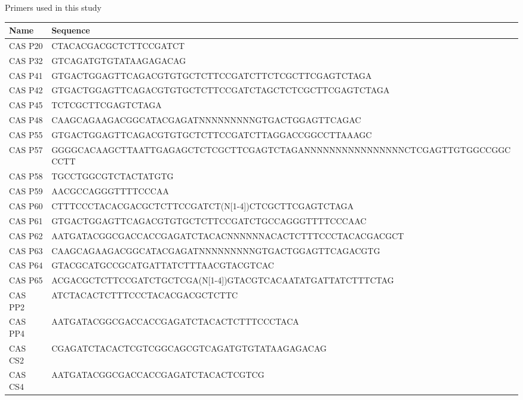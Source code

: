 \begin{supptable}[htb]
    \centering
    \caption{Primers used in this study}
      \begin{tabular}{lp{13cm}}
      \toprule
      \textbf{Name} & \textbf{Sequence} \\
      \midrule
      CAS P20 & CTACACGACGCTCTTCCGATCT \\
      CAS P32 & GTCAGATGTGTATAAGAGACAG \\
      CAS P41 & GTGACTGGAGTTCAGACGTGTGCTCTTCCGATCTTCTCGCTTCGAGTCTAGA \\
      CAS P42 & GTGACTGGAGTTCAGACGTGTGCTCTTCCGATCTAGCTCTCGCTTCGAGTCTAGA \\
      CAS P45 & TCTCGCTTCGAGTCTAGA \\
      CAS P48 & CAAGCAGAAGACGGCATACGAGATNNNNNNNNNGTGACTGGAGTTCAGAC \\
      CAS P55 & GTGACTGGAGTTCAGACGTGTGCTCTTCCGATCTTAGGACCGGCCTTAAAGC \\
      CAS P57 & GGGGCACAAGCTTAATTGAGAGCTCTCGCTTCGAGTCTAGANNNNNNNNNNNNNNNNCTCGAGTTGTGGCCGGCCCTT \\
      CAS P58 & TGCCTGGCGTCTACTATGTG \\
      CAS P59 & AACGCCAGGGTTTTCCCAA \\
      CAS P60 & CTTTCCCTACACGACGCTCTTCCGATCT(N[1-4])CTCGCTTCGAGTCTAGA \\
      CAS P61 & GTGACTGGAGTTCAGACGTGTGCTCTTCCGATCTGCCAGGGTTTTCCCAAC \\
      CAS P62 & AATGATACGGCGACCACCGAGATCTACACNNNNNNACACTCTTTCCCTACACGACGCT \\
      CAS P63 & CAAGCAGAAGACGGCATACGAGATNNNNNNNNNGTGACTGGAGTTCAGACGTG \\
      CAS P64 & GTACGCATGCCGCATGATTATCTTTAACGTACGTCAC \\
      CAS P65 & ACGACGCTCTTCCGATCTGCTCGA(N[1-4])GTACGTCACAATATGATTATCTTTCTAG \\
      CAS PP2 & ATCTACACTCTTTCCCTACACGACGCTCTTC \\
      CAS PP4 & AATGATACGGCGACCACCGAGATCTACACTCTTTCCCTACA \\
      CAS CS2 & CGAGATCTACACTCGTCGGCAGCGTCAGATGTGTATAAGAGACAG \\
      CAS CS4 & AATGATACGGCGACCACCGAGATCTACACTCGTCG \\
      \bottomrule
      \end{tabular}%
    \label{tab:cas_tableS1}%
  \end{supptable}%
  

